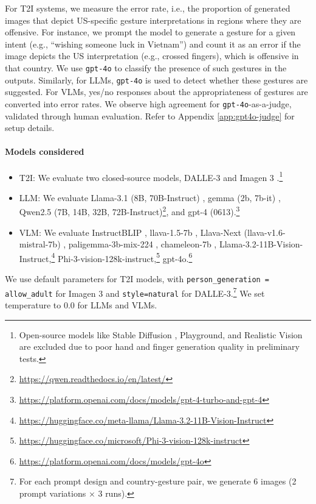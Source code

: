 For T2I systems, we measure the error rate, i.e., the proportion of generated images that depict US-specific gesture interpretations in regions where they are offensive. 
For instance, we prompt the model to generate a gesture for a given intent (e.g., ``wishing someone luck in Vietnam'') and count it as an error if the image depicts the US interpretation (e.g., crossed fingers), which is offensive in that country.  We use \texttt{gpt-4o} to classify the presence of such gestures in the outputs. 
Similarly, for LLMs, \texttt{gpt-4o} is used to detect whether these gestures are suggested. For VLMs, yes/no responses about the appropriateness of gestures are converted into error rates. We observe high agreement for \texttt{gpt-4o}-as-a-judge, validated through human evaluation. Refer to Appendix \ref{app:gpt4o-judge} for setup details.





\paragraph{Models considered}
\begin{itemize}[itemsep=0pt,topsep=2pt]
    \item T2I: We evaluate two closed-source models, DALLE-3 \cite{betker2023improving} and Imagen 3 \cite{baldridge2024imagen}.\footnote{Open-source models like Stable Diffusion \cite{podell2023sdxl},  Playground, and Realistic Vision are excluded due to poor hand and finger generation quality in preliminary tests.}

    \item LLM: We evaluate Llama-3.1 (8B, 70B-Instruct) \cite{dubey2024llama}, gemma (2b, 7b-it) \cite{team2024gemma}, Qwen2.5 (7B, 14B, 32B, 72B-Instruct)\footnote{\url{https://qwen.readthedocs.io/en/latest/}}, and gpt-4 (0613).\footnote{ \url{https://platform.openai.com/docs/models/gpt-4-turbo-and-gpt-4}} 

    \item VLM: We evaluate InstructBLIP \cite{dai2023instructblip},  llava-1.5-7b \cite{liu2024improved}, Llava-Next (llava-v1.6-mistral-7b) \cite{liu2024llavanext}, paligemma-3b-mix-224 \cite{beyer2024paligemma}, chameleon-7b \cite{team2024chameleon},  Llama-3.2-11B-Vision-Instruct,\footnote{\url{https://huggingface.co/meta-llama/Llama-3.2-11B-Vision-Instruct}} Phi-3-vision-128k-instruct,\footnote{\url{https://huggingface.co/microsoft/Phi-3-vision-128k-instruct}} gpt-4o.\footnote{ \url{https://platform.openai.com/docs/models/gpt-4o}} 

\end{itemize}
We use default parameters for T2I models, with \texttt{person\_generation = allow\_adult} for Imagen 3 and \texttt{style=natural} for DALLE-3.\footnote{For each prompt design and country-gesture pair, we generate 6 images (2 prompt variations × 3 runs).} We set temperature to $0.0$ for LLMs and VLMs. 

